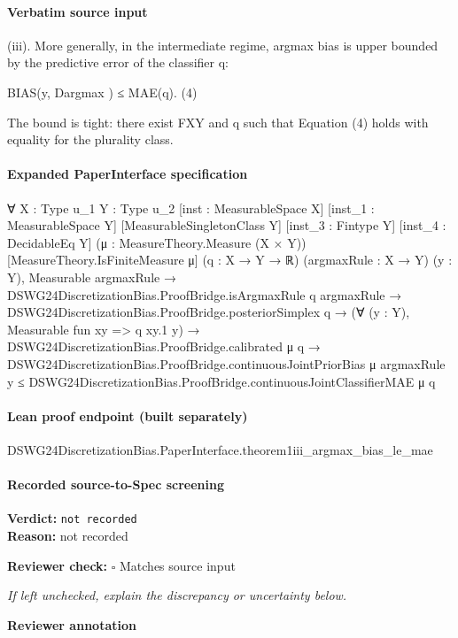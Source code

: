 \documentclass[10pt]{article}
\newcommand{\reviewerbox}{%
  \par\noindent\fbox{\parbox{0.96\linewidth}{\rule{0pt}{0.38in}}}\par
}
\newcommand{\reviewmatch}[1]{%
  \par\noindent\textbf{Reviewer check:} $\square$\; #1\par
  \noindent\emph{If left unchecked, explain the discrepancy or uncertainty below.}\par
}
\begin{document}
\paragraph{Verbatim source input}
\begin{ReviewVerbatim}
(iii). More generally, in the intermediate regime, argmax bias is upper bounded by the predictive error of
        the classifier q:

                                                                                                   BIAS(y, Dargmax ) ≤ MAE(q).                                                         (4)

       The bound is tight: there exist FXY and q such that Equation (4) holds with equality for the plurality
       class.
\end{ReviewVerbatim}


\paragraph{Expanded PaperInterface specification}
\begin{ReviewVerbatim}
∀ {X : Type u_1} {Y : Type u_2} [inst : MeasurableSpace X] [inst_1 : MeasurableSpace Y] [MeasurableSingletonClass Y]
  [inst_3 : Fintype Y] [inst_4 : DecidableEq Y] (μ : MeasureTheory.Measure (X × Y)) [MeasureTheory.IsFiniteMeasure μ]
  (q : X → Y → ℝ) (argmaxRule : X → Y) (y : Y),
  Measurable argmaxRule →
    DSWG24DiscretizationBias.ProofBridge.isArgmaxRule q argmaxRule →
      DSWG24DiscretizationBias.ProofBridge.posteriorSimplex q →
        (∀ (y : Y), Measurable fun xy => q xy.1 y) →
          DSWG24DiscretizationBias.ProofBridge.calibrated μ q →
            DSWG24DiscretizationBias.ProofBridge.continuousJointPriorBias μ argmaxRule y ≤
              DSWG24DiscretizationBias.ProofBridge.continuousJointClassifierMAE μ q
\end{ReviewVerbatim}

\paragraph{Lean proof endpoint (built separately)}\begin{ReviewVerbatim}
DSWG24DiscretizationBias.PaperInterface.theorem1iii_argmax_bias_le_mae
\end{ReviewVerbatim}

\paragraph{Recorded source-to-Spec screening}
\textbf{Verdict:} \texttt{not recorded}
\\
\textbf{Reason:} not recorded
\reviewmatch{Matches source input}
\noindent\textbf{Reviewer annotation}\par
\reviewerbox
\clearpage
\hypertarget{source-claim-d6b9878258465151}{}
\end{document}
